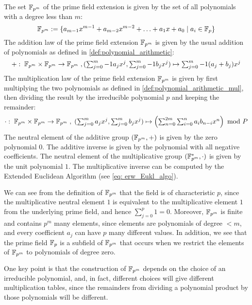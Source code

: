 The set $\mathbb{F}_{p^m}$ of the prime field extension is given by the set of all polynomials with a degree less than $m$:
\begin{equation}
\label{eq:prime-extension-field}
\mathbb{F}_{p^m}:= \{a_{m-1} x^{m-1}+a_{m-2}x^{m-2}+\ldots+a_1 x+a_0\;|\; a_i\in \mathbb{F}_p\}
\end{equation}
The addition law of the prime field extension $\mathbb{F}_{p^m}$ is given by the usual addition of polynomials as defined in \eqref{def:polynomial_arithmetic}: 
\begin{equation}
+:\; \mathbb{F}_{p^m}\times \mathbb{F}_{p^m} \to \mathbb{F}_{p^m}\; , \textstyle (\sum_{j=0}^m-1 a_j x^j,\sum_{j=0}^m-1 b_j x^j)\mapsto \sum_{j=0}^m-1 (a_j+b_j) x^j
\end{equation}
The multiplication law of the prime field extension $\mathbb{F}_{p^m}$ is given by first multiplying the two polynomials as defined in \eqref{def:polynomial_arithmetic_mul},  then dividing the result by the irreducible polynomial $p$ and keeping the remainder:
\begin{equation}
\cdot : \; \mathbb{F}_{p^m}\times \mathbb{F}_{p^m} \to \mathbb{F}_{p^m}\; , \textstyle\; (\sum_{j=0}^m a_j x^j,\sum_{j=0}^m b_j x^j)\mapsto \left(\sum _{n = 0} ^{2m} \sum _{i = 0} ^{n}{a} _{i }{{b} _{n-i}}{x} ^{n}\right) \text{ mod } P
\end{equation}
The neutral element of the additive group $(\mathbb{F}_{p^m},+)$ is given by the zero polynomial $0$. The additive inverse is given by the polynomial with all negative coefficients. The neutral element of the multiplicative group $(\mathbb{F}^*_{p^m},\cdot)$ is given by the unit polynomial $1$. The multiplicative inverse can be computed by the Extended Euclidean Algorithm (see \ref{eq: erw_Eukl_algo}).

We can see from the definition of $\mathbb{F}_{p^m}$ that the field is of characteristic $p$, since the multiplicative neutral element $1$ is equivalent to the multiplicative element $1$ from the underlying prime field, and hence $\sum_{j=0}^p 1=0$. Moreover, $\mathbb{F}_{p^m}$ is finite and contains $p^m$ many elements, since elements are polynomials of degree $<m$, and every coefficient $a_j$ can have $p$ many different values. In addition, we see that the prime field $\mathbb{F}_p$ is a subfield of $\mathbb{F}_{p^m}$ that occurs when we restrict the elements of $\mathbb{F}_{p^m}$ to polynomials of degree zero.

One key point is that the construction of $\mathbb{F}_{p^m}$ depends on the choice of an irreducible polynomial, and, in fact, different choices will give different multiplication tables, since the remainders from dividing a polynomial product by those polynomials will be different.

